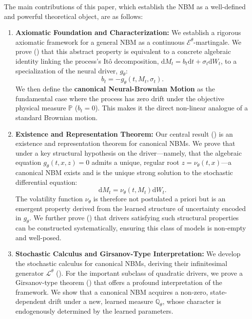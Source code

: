 \documentclass[qian]{imsart}
\newcommand{\Qbb}{\mathbb{Q}}
\newcommand{\Prob}{\mathbb{P}}
\newcommand{\cEneutheta}{\mathcal{E}^{\theta}}
\newcommand{\dd}{\mathrm{d}}
\newcommand{\Lcaltheta}{\mathcal{L}^{\theta}}
\theoremstyle{plain}
\theoremstyle{definition}
\begin{document}
The main contributions of this paper, which establish the NBM as a well-defined and powerful theoretical object, are as follows:
\begin{enumerate}
    \item \textbf{Axiomatic Foundation and Characterization:} We establish a rigorous axiomatic framework for a general NBM as a continuous $\cEneutheta$-martingale. We prove () that this abstract property is equivalent to a concrete algebraic identity linking the process's Itô decomposition, $\dd M_t = b_t \dd t + \sigma_t \dd W_t$, to a specialization of the neural driver, $g_\theta$:
    \[
        b_t = -g_\theta(t, M_t, \sigma_t).
    \]
    We then define the \textbf{canonical Neural-Brownian Motion} as the fundamental case where the process has zero drift under the objective physical measure $\Prob$ ($b_t=0$). This makes it the direct non-linear analogue of a standard Brownian motion.

    \item \textbf{Existence and Representation Theorem:} Our central result () is an existence and representation theorem for canonical NBMs. We prove that under a key structural hypothesis on the driver—namely, that the algebraic equation $g_\theta(t, x, z) = 0$ admits a unique, regular root $z = \nu_\theta(t,x)$—a canonical NBM exists and is the unique strong solution to the stochastic differential equation:
    \[
        \dd M_t = \nu_\theta(t, M_t) \dd W_t.
    \]
    The volatility function $\nu_\theta$ is therefore not postulated a priori but is an emergent property derived from the learned structure of uncertainty encoded in $g_\theta$. We further prove () that drivers satisfying such structural properties can be constructed systematically, ensuring this class of models is non-empty and well-posed.

    \item \textbf{Stochastic Calculus and Girsanov-Type Interpretation:} We develop the stochastic calculus for canonical NBMs, deriving their infinitesimal generator $\Lcaltheta$ (). For the important subclass of quadratic drivers, we prove a Girsanov-type theorem () that offers a profound interpretation of the framework. We show that a canonical NBM acquires a non-zero, state-dependent drift under a new, learned measure $\Qbb_\theta$, whose character is endogenously determined by the learned parameters.


\end{enumerate}
\end{document}
